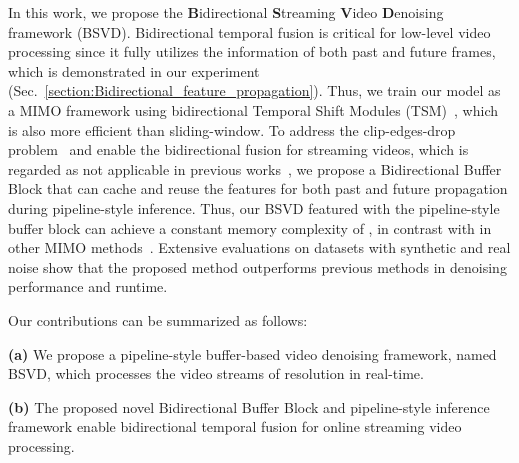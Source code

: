 \documentclass[sigconf]{acmart}
\begin{document}
In this work, we propose the \textbf{B}idirectional \textbf{S}treaming \textbf{V}ideo \textbf{D}enoising framework (BSVD). 
Bidirectional temporal fusion is critical for low-level video processing since it fully utilizes the information of both past and future frames, which is demonstrated in our experiment (Sec.~\ref{section:Bidirectional_feature_propagation}). Thus, we train our model as a MIMO framework using bidirectional Temporal Shift Modules (TSM)~\cite{Lin2019TSM}, which is also more efficient than sliding-window.
To address the clip-edges-drop problem~\cite{chan2021basicvsr,liang2022vrt} and enable the bidirectional fusion for streaming videos, which is regarded as not applicable in previous works~\cite{Lin2019TSM,Kondratyuk2021movinets}, we propose a Bidirectional Buffer Block that can cache and reuse the features for both past and future propagation during pipeline-style inference.
Thus, our BSVD featured with the pipeline-style buffer block can achieve a constant memory complexity of , in contrast with  in other MIMO methods~\cite{chan2021basicvsr, liang2022vrt}. Extensive evaluations on datasets with synthetic and real noise show that the proposed method outperforms previous methods in denoising performance and runtime.




Our contributions can be summarized as follows:

\textbf{(a)} We propose a pipeline-style buffer-based video denoising framework, named BSVD, which processes the video streams of resolution  in real-time.


\textbf{(b)} 
The proposed novel Bidirectional Buffer Block and pipeline-style inference framework enable bidirectional temporal fusion for online streaming video processing.
\end{document}
